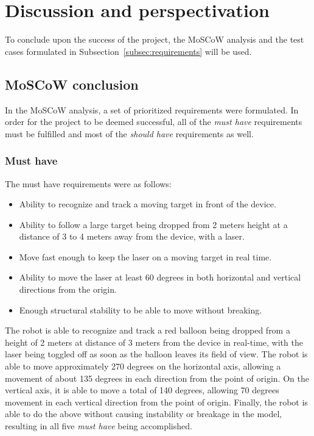 \section{Discussion and perspectivation}
To conclude upon the success of the project, the MoSCoW analysis and the test cases formulated in Subsection~\ref{subsec:requirements} will be used.

\subsection{MoSCoW conclusion}
In the MoSCoW analysis, a set of prioritized requirements were formulated.
In order for the project to be deemed successful, all of the \textit{must have} requirements must be fulfilled and most of the \textit{should have} requirements as well.

\subsubsection{Must have}
The must have requirements were as follows:
\begin{itemize}
	\item Ability to recognize and track a moving target in front of the device.
	\item Ability to follow a large target being dropped from 2 meters height at a distance of 3 to 4 meters away from the device, with a laser.
	\item Move fast enough to keep the laser on a moving target in real time.
	\item Ability to move the laser at least 60 degrees in both horizontal and vertical directions from the origin.
	\item Enough structural stability to be able to move without breaking.
\end{itemize}

The robot is able to recognize and track a red balloon being dropped from a height of 2 meters at distance of 3 meters from the device in real-time, with the laser being toggled off as soon as the balloon leaves its field of view. 
The robot is able to move approximately 270 degrees on the horizontal axis, allowing a movement of about 135 degrees in each direction from the point of origin.
On the vertical axis, it is able to move a total of 140 degrees, allowing 70 degrees movement in each vertical direction from the point of origin.
Finally, the robot is able to do the above without causing instability or breakage in the model, resulting in all five \textit{must have} being accomplished.


